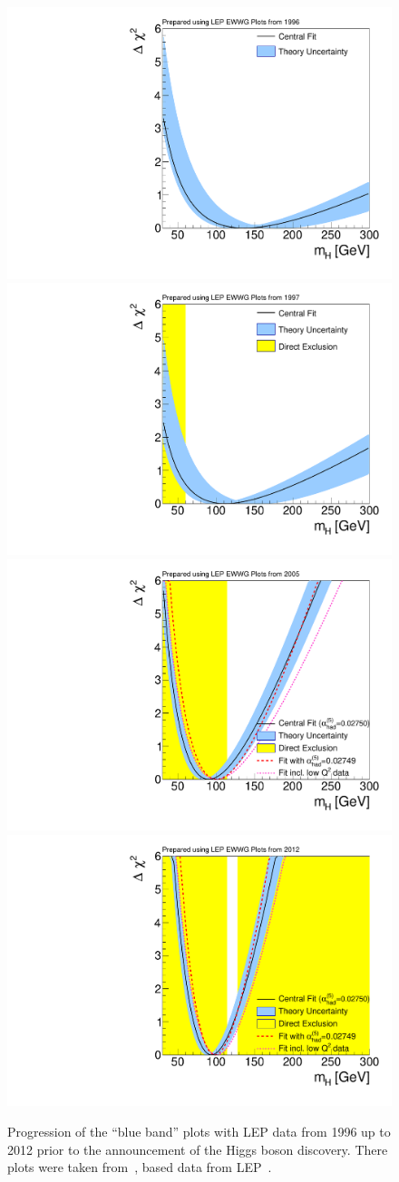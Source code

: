 \begin{figure}[b!]
	\begin{center}
		\includegraphics[width=.275 \linewidth]{figures/blueband/BlueBand_1996}
		\hspace{-0.75 cm}
		\includegraphics[width=.275 \linewidth]{figures/blueband/BlueBand_1997}
		\hspace{-0.75 cm}
		\includegraphics[width=.275 \linewidth]{figures/blueband/BlueBand_2005}
		\hspace{-0.75 cm}
		\includegraphics[width=.275 \linewidth]{figures/blueband/BlueBand_2012}
		\caption{Progression of the ``blue band'' plots with LEP data from 1996 up to 2012 prior to the announcement of the Higgs boson discovery. There plots were taken from~\cite{Erler:2019hds}, based data from LEP~\cite{ALEPH:2005ab}. \label{fig:buleband} }
	\end{center}
\end{figure}
